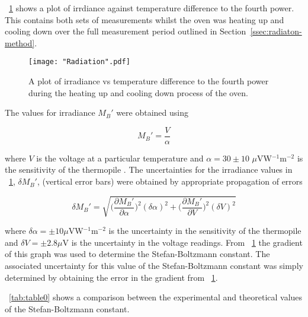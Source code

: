 \documentclass{article}
\newcommand{\figref}[2][\figurename~]{#1\ref{#2}}
\newcommand{\tabref}[2][\tablename~]{#1\ref{#2}}
\newcommand{\secref}[2][Section~]{#1\ref{#2}}
\begin{document}
\figref{fig:radiation_graph} shows a plot of irrdiance against temperature difference to the fourth power. This contains both sets of measurements whilst the oven was heating up and cooling down over the full measurement period outlined in \secref{ssec:radiaton-method}.

\begin{figure}[h]
\centering
\texttt{[image: "Radiation".pdf]}
\caption{A plot of irradiance vs temperature difference to the fourth power during the heating up and cooling down process of the oven.}
\label{fig:radiation_graph}
\end{figure}

\vspace{2mm}
\noindent
The values for irradiance $M_B'$ were obtained using

\begin{equation}
\label{eq:sensitivity}
M_B' = \frac{V}{\alpha}
\end{equation}

\vspace{2mm}
\noindent
where $V$ is the voltage at a particular temperature and $\alpha = 30 \pm 10$ $\mu$VW$^{-1}$m$^{-2}$ is the sensitivity of the thermopile \cite{Paper01}. The uncertainties for the irradiance values in \figref{fig:radiation_graph}, $\delta M_B'$, (vertical error bars) were obtained by appropriate propagation of errors

\begin{equation}
\label{eq:sensitivity-error}
\delta M_B' = \sqrt{\bigg(\frac{\partial{M_B'}}{\partial{\alpha}}\bigg)^2(\delta \alpha)^2 + \bigg(\frac{\partial{M_B'}}{\partial{V}}\bigg)^2(\delta V)^2 }
\end{equation}

\vspace{2mm}
\noindent
where $\delta \alpha = \pm 10 \mu$VW$^{-1}$m$^{-2}$ is the uncertainty in the sensitivity of the thermopile and $\delta V = \pm 2.8 \mu$V is the uncertainty in the voltage readings. From \figref{fig:radiation_graph} the gradient of this graph was used to determine the Stefan-Boltzmann constant. The associated uncertainty for this value of the Stefan-Boltzmann constant was simply determined by obtaining the error in the gradient from \figref{fig:radiation_graph}.

\vspace{2mm}
\noindent
\tabref{tab:table0} shows a comparison between the experimental and theoretical values of the Stefan-Boltzmann constant.
\end{document}
